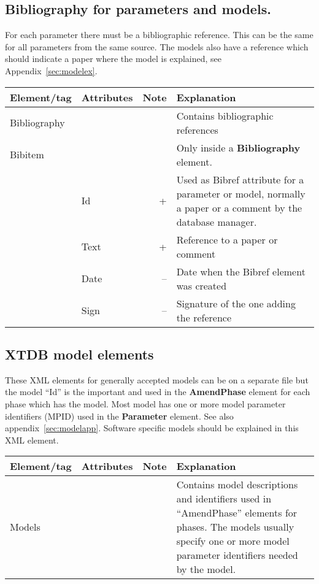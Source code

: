 \documentclass{article}
\begin{document}

\subsection{Bibliography for parameters and models.}\label{sec:biblio}

For each parameter there must be a bibliographic reference.  This can
be the same for all parameters from the same source.  The models also
have a reference which should indicate a paper where the model is
explained, see Appendix~\ref{sec:modelex}.

\bigskip
\begin{tabular}{|p{} p{} r p{}|}\hline
  Element/tag & Attributes & Note & Explanation\\\hline

  Bibliography & && Contains bibliographic references\\\hline

  Bibitem & && Only inside a {\bf Bibliography} element.\\
      & Id & + &   Used as Bibref attribute for a parameter or model, normally a paper or a comment by the database manager.\\
      & Text & + & Reference to a paper or comment\\
      & Date & -- & Date when the Bibref element was created\\
      & Sign & -- & Signature of the one adding the reference\\\hline

\end{tabular}


\subsection{XTDB model elements}\label{sec:models}

These XML elements for generally accepted models can be on a separate
file but the model ``Id'' is the important and used in the {\bf
  AmendPhase} element for each phase which has the model.  Most model
has one or more model parameter identifiers (MPID) used in the {\bf
  Parameter} element.  See also appendix~\ref{sec:modelapp}.  Software
specific models should be explained in this XML element.

\bigskip
\begin{tabular}{|p{} p{} r p{}|}\hline
  Element/tag & Attributes & Note & Explanation\\\hline

  Models   & && Contains model descriptions and identifiers used in ``AmendPhase'' elements for phases.  The models usually specify one or more model parameter identifiers needed by the model.\\\hline
\end{tabular}
\end{document}
